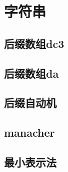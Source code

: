 \section{字符串}

\subsection{后缀数组dc3}


\subsection{后缀数组da}


\subsection{后缀自动机}


\subsection{manacher}


\subsection{最小表示法}



